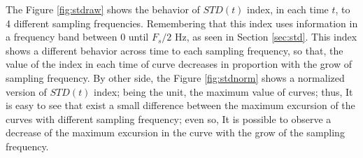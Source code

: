 \documentclass[review]{elsarticle}
\begin{document}
The Figure \ref{fig:stdraw} shows the  behavior of $STD(t)$ index, in each time $t$, 
to 4 different sampling frequencies. Remembering that this index uses information in a frequency
band between $0$ until $F_s/2$ Hz, as seen in Section \ref{sec:std}.
This index shows a different behavior across time to each sampling frequency,
so that, the value of the index in each time of curve decreases in proportion with 
the grow of sampling frequency. By other side,
the Figure \ref{fig:stdnorm} shows a normalized version of $STD(t)$ index;
being the unit, the maximum value of curves; thus,
It is easy to see that exist a small difference between the maximum excursion 
of the curves with different sampling frequency; even so, It is possible to observe
a decrease of the maximum excursion in the curve with the grow of the sampling frequency.
\end{document}
